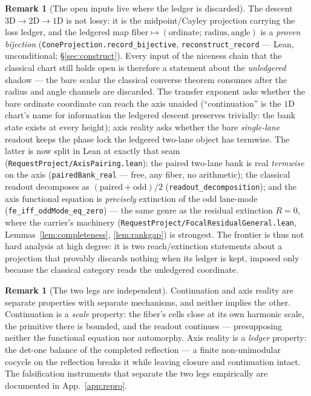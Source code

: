 \documentclass[11pt]{article}
\theoremstyle{definition}
\newtheorem{remark}[theorem]{Remark}
\begin{document}
\begin{remark}[The open inputs live where the ledger is discarded]\label{rem:ledgertoll}
The descent $3\mathrm D\to2\mathrm D\to1\mathrm D$ is not lossy: it is the midpoint/Cayley projection
carrying the loss ledger, and the ledgered map $\text{fiber}\mapsto(\text{ordinate};\,\text{radius},
\text{angle})$ is a \emph{proven bijection} (\texttt{ConeProjection.record\_bijective},
\texttt{reconstruct\_record} --- Lean, unconditional; \S\ref{sec:construct}). Every input of
the niceness chain that the classical chart still holds open is therefore a statement about the \emph{unledgered} shadow --- the bare scalar the
classical converse theorem consumes after the radius and angle channels are discarded. The transfer
exponent asks whether the bare ordinate coordinate can reach the axis unaided (``continuation'' is the
$1$D chart's name for information the ledgered descent preserves trivially: the bank state exists at every
height); axis reality asks whether the bare \emph{single-lane} readout keeps the phase lock the ledgered
two-lane object has termwise. The latter is now split in Lean at exactly that seam
(\texttt{RequestProject/AxisPairing.lean}): the paired two-lane bank is real \emph{termwise} on the axis
(\texttt{pairedBank\_real} --- free, any fiber, no arithmetic); the classical readout decomposes as
$(\text{paired}+\text{odd})/2$ (\texttt{readout\_decomposition}); and the axis functional equation is
\emph{precisely} extinction of the odd lane-mode (\texttt{fe\_iff\_oddMode\_eq\_zero}) --- the same genre as
the residual extinction $R=0$, where the carrier's machinery
(\texttt{RequestProject/FocalResidualGeneral.lean}, Lemmas~\ref{lem:completeness}, \ref{lem:rankgap})
is strongest. The frontier is thus not hard analysis at high
degree: it is two reach/extinction statements about a projection that provably discards nothing when its
ledger is kept, imposed only because the classical category reads the unledgered coordinate.
\end{remark}

\begin{remark}[The two legs are independent]\label{rem:twogates}
Continuation and axis reality are separate properties with separate mechanisms, and neither implies the
other. Continuation is a \emph{scale} property: the fiber's cells close at its own harmonic scale, the
primitive there is bounded, and the readout continues --- presupposing neither the functional equation
nor automorphy. Axis reality is a \emph{ledger} property: the det-one balance of the completed
reflection --- a finite non-unimodular cocycle on the reflection breaks it while leaving closure and
continuation intact. The falsification instruments that separate the two legs empirically are documented
in App.~\ref{app:repro}.
\end{remark}
\end{document}
